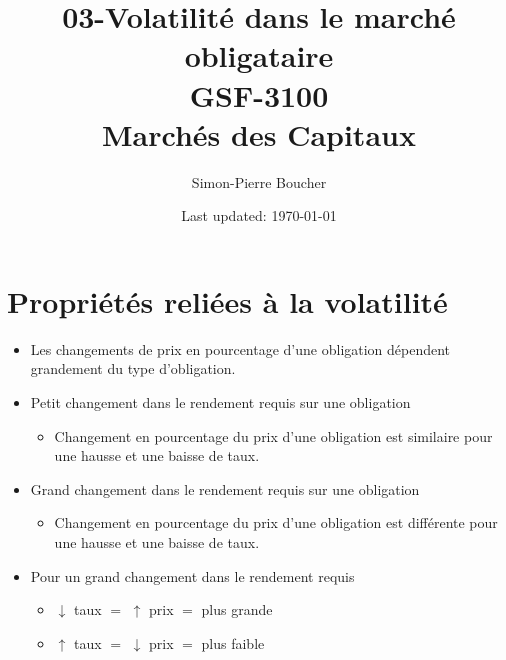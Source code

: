 \documentclass[letterpaper, 12pt]{article}
\newcommand{\1}{\mathds{1}}	%
\theoremstyle{definition}
\begin{document}

\title{03-Volatilité dans le marché obligataire \\[1em]
\normalsize GSF-3100 \\ Marchés des Capitaux}


\author{\normalsize Simon-Pierre Boucher}
\date{\normalsize\vspace{-1ex} Last updated: \today}


\maketitle
\tableofcontents\label{sec:contents}


\newpage

\section{Propriétés reliées à la volatilité}
\begin{itemize}
\item Les changements de prix en pourcentage d'une obligation dépendent grandement du type d'obligation. 
\item Petit changement dans le rendement requis sur une obligation 
\begin{itemize}
\item Changement en pourcentage du prix d'une obligation est similaire pour une hausse et une baisse de taux.
\end{itemize}
\item Grand changement dans le rendement requis sur une obligation 
\begin{itemize}
\item Changement en pourcentage du prix d'une obligation est différente pour une hausse et une baisse de taux.
\end{itemize}
\item Pour un grand changement dans le rendement requis 
\begin{itemize}
\item $\downarrow$ taux $=$ $\uparrow$ prix $=$ plus grande
\item $\uparrow$ taux $=$ $\downarrow$ prix $=$ plus faible
\end{itemize}
\end{itemize}
\end{document}
